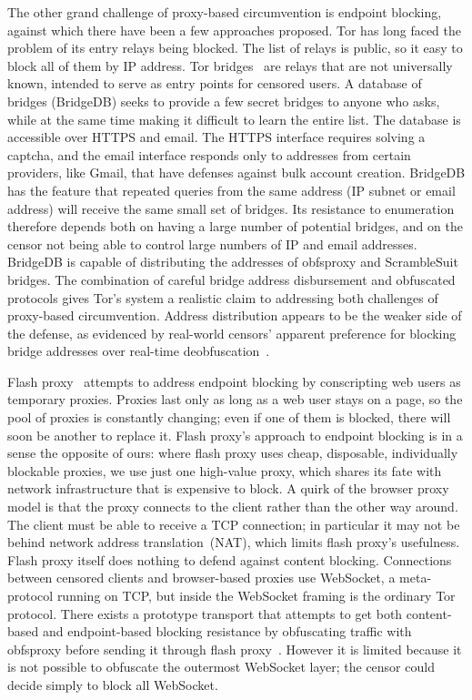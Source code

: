 \documentclass[conference]{IEEEtran}
\begin{document}
The other grand challenge of proxy-based circumvention is endpoint blocking,
against which there have been a few approaches proposed.
Tor has long faced the problem of its entry relays being blocked. The list of
relays is public, so it easy to block all of them by IP address. Tor
bridges~\cite{tor-blocking} are relays that are not universally known, intended
to serve as entry points for censored users. A database of bridges (BridgeDB) seeks to
provide a few secret bridges to anyone who asks, while at the same time making it
difficult to learn the entire list.
The database is accessible over HTTPS and email.
The HTTPS interface requires solving a captcha,
and the email interface responds only to addresses from certain providers, like Gmail,
that have defenses against bulk account creation.
BridgeDB has the feature that repeated queries from the same address
(IP subnet or email address) will receive the same small set of bridges.
Its resistance to enumeration therefore depends both on
having a large number of potential bridges,
and on the censor not being able to control large numbers of IP and email addresses.
BridgeDB is capable of distributing
the addresses of obfsproxy and ScrambleSuit bridges.
The combination
of careful bridge address disbursement and obfuscated protocols
gives Tor's system a realistic claim to addressing both challenges of proxy-based circumvention.
Address distribution appears to be the weaker side of the defense,
as evidenced by real-world censors' apparent preference for
blocking bridge addresses over real-time deobfuscation~\cite{foci12-winter}.

Flash proxy~\cite{flashproxy} attempts to address endpoint blocking by
conscripting web users as temporary proxies. Proxies last only as long as a web
user stays on a page, so the pool of proxies is constantly changing;
even if one of them is blocked, there will soon be another to replace it.
Flash proxy's approach to endpoint blocking is in a sense
the opposite of ours: where flash proxy uses cheap, disposable, individually blockable proxies,
we use just one high-value proxy, which shares its fate with network
infrastructure that is expensive to block.
A quirk of the browser proxy model is that the proxy connects to the client rather than the other way around.
The client must be able to receive a TCP connection; in particular it
may not be behind network address translation~(NAT), which limits flash proxy's usefulness.
Flash proxy itself does nothing to defend against content blocking.
Connections between censored clients and browser-based proxies use
WebSocket, a meta-protocol running on TCP,
but inside the WebSocket framing is the ordinary Tor protocol.
There exists a prototype transport that attempts to get both
content-based and endpoint-based blocking resistance by obfuscating traffic
with obfsproxy before sending it through flash proxy~\cite{obfs-flash}.
However it is limited because it is not
possible to obfuscate the outermost WebSocket layer;
the censor could decide simply to block all WebSocket.
\end{document}
